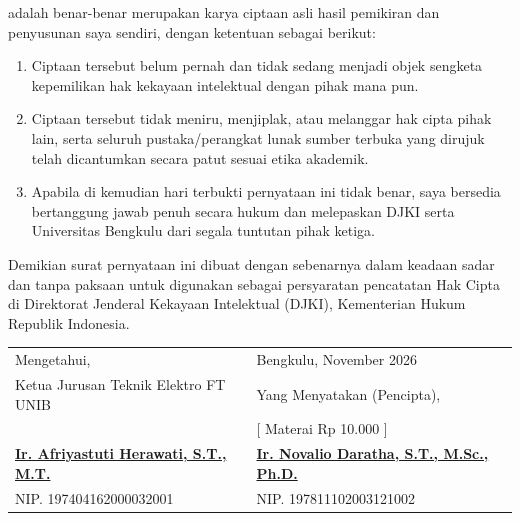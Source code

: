 \documentclass[11pt,a4paper]{article}
\begin{document}
\vspace{0.15cm}
\noindent adalah benar-benar merupakan karya ciptaan asli hasil pemikiran dan penyusunan saya sendiri, dengan ketentuan sebagai berikut:
\begin{enumerate}[label=\textbf{\alph*.}, leftmargin=1.8em, itemsep=3pt]
    \item Ciptaan tersebut belum pernah dan tidak sedang menjadi objek sengketa kepemilikan hak kekayaan intelektual dengan pihak mana pun.
    \item Ciptaan tersebut tidak meniru, menjiplak, atau melanggar hak cipta pihak lain, serta seluruh pustaka/perangkat lunak sumber terbuka yang dirujuk telah dicantumkan secara patut sesuai etika akademik.
    \item Apabila di kemudian hari terbukti pernyataan ini tidak benar, saya bersedia bertanggung jawab penuh secara hukum dan melepaskan DJKI serta Universitas Bengkulu dari segala tuntutan pihak ketiga.
\end{enumerate}

\vspace{0.25cm}
\noindent Demikian surat pernyataan ini dibuat dengan sebenarnya dalam keadaan sadar dan tanpa paksaan untuk digunakan sebagai persyaratan pencatatan Hak Cipta di Direktorat Jenderal Kekayaan Intelektual (DJKI), Kementerian Hukum Republik Indonesia.

\vspace{0.8cm}
\noindent
\begin{tabular}{p{8.2cm}p{7.3cm}}
Mengetahui, & Bengkulu, November 2026 \\
Ketua Jurusan Teknik Elektro FT UNIB & Yang Menyatakan (Pencipta), \\[0.45cm]
 & {\footnotesize \color{gray}[ Materai Rp 10.000 ]} \\[1.25cm]
\textbf{\underline{Ir. Afriyastuti Herawati, S.T., M.T.}} & \textbf{\underline{Ir. Novalio Daratha, S.T., M.Sc., Ph.D.}} \\
NIP. 197404162000032001 & NIP. 197811102003121002 \\
\end{tabular}
\end{document}
